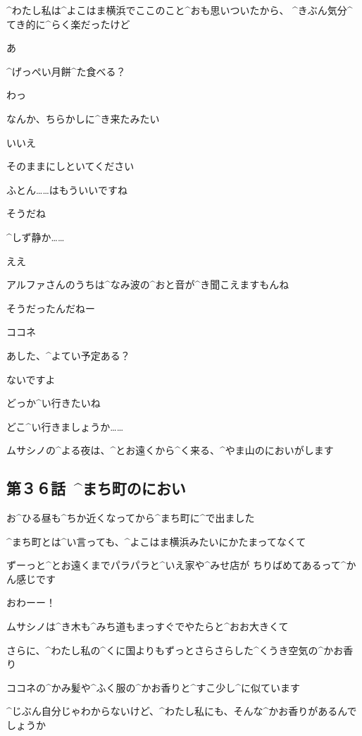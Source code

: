 \A ^{わたし}{私}は^{よこはま}{横浜}でここのこと^{おも}{思}いついたから、
^{きぶん}{気分}^{てき}{的}に^{らく}{楽}だったけど

\A あ

\A ^{げっぺい}{月餅}^{た}{食}べる？

\K わっ

\page[51]
\A なんか、ちらかしに^{き}{来}たみたい

\K いいえ

\K そのままにしといてください

\K ふとん……はもういいですね

\A そうだね

\page[53]
\A ^{しず}{静}か……

\K ええ

\K アルファさんのうちは^{なみ}{波}の^{おと}{音}が^{き}{聞}こえますもんね

\A そうだったんだねー

\page
\A ココネ

\A あした、^{よてい}{予定}ある？

\K ないですよ

\A どっか^{い}{行}きたいね

\K どこ^{い}{行}きましょうか……

\page[56]
\A ムサシノの^{よる}{夜}は、^{とお}{遠}くから^{く}{来}る、^{やま}{山}のにおいがします


\subsection{第３６話\ ^{まち}{町}のにおい}

\page[58]
\A お^{ひる}{昼}も^{ちか}{近}くなってから^{まち}{町}に^{で}{出}ました

\page
\A ^{まち}{町}とは^{い}{言}っても、^{よこはま}{横浜}みたいにかたまってなくて

\A ずーっと^{とお}{遠}くまでパラパラと^{いえ}{家}や^{みせ}{店}が
ちりばめてあるって^{かん}{感}じです

\A おわーー！

\page
\A ムサシノは^{き}{木}も^{みち}{道}もまっすぐでやたらと^{おお}{大}きくて

\page
\A さらに、^{わたし}{私}の^{くに}{国}よりもずっとさらさらした^{くうき}{空気}の^{かお}{香}り

\A ココネの^{かみ}{髪}や^{ふく}{服}の^{かお}{香}りと^{すこ}{少}し^{に}{似}ています

\A ^{じぶん}{自分}じゃわからないけど、^{わたし}{私}にも、そんな^{かお}{香}りがあるんでしょうか

